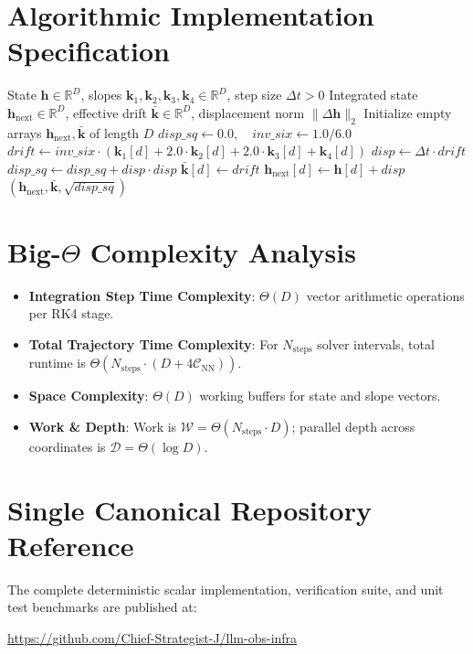 \documentclass[11pt,a4paper]{article}
\theoremstyle{definition}
\begin{document}
\section{Algorithmic Implementation Specification}

\begin{algorithm}[H]
\caption{Fourth-Order Runge-Kutta (RK4) Discrete ODE Integration Step}
\begin{algorithmic}[1]
\Require State $\mathbf{h} \in \mathbb{R}^D$, slopes $\mathbf{k}_1, \mathbf{k}_2, \mathbf{k}_3, \mathbf{k}_4 \in \mathbb{R}^D$, step size $\Delta t > 0$
\Ensure Integrated state $\mathbf{h}_{\text{next}} \in \mathbb{R}^D$, effective drift $\bar{\mathbf{k}} \in \mathbb{R}^D$, displacement norm $\|\Delta \mathbf{h}\|_2$
\State Initialize empty arrays $\mathbf{h}_{\text{next}}, \bar{\mathbf{k}}$ of length $D$
\State $disp\_sq \gets 0.0, \quad inv\_six \gets 1.0 / 6.0$
    \State $drift \gets inv\_six \cdot (\mathbf{k}_1[d] + 2.0 \cdot \mathbf{k}_2[d] + 2.0 \cdot \mathbf{k}_3[d] + \mathbf{k}_4[d])$
    \State $disp \gets \Delta t \cdot drift$
    \State $disp\_sq \gets disp\_sq + disp \cdot disp$
    \State $\bar{\mathbf{k}}[d] \gets drift$
    \State $\mathbf{h}_{\text{next}}[d] \gets \mathbf{h}[d] + disp$
\EndFor
\State \Return $(\mathbf{h}_{\text{next}}, \bar{\mathbf{k}}, \sqrt{disp\_sq})$
\end{algorithmic}
\end{algorithm}

\section{Big-$\Theta$ Complexity Analysis}

\begin{itemize}
    \item \textbf{Integration Step Time Complexity}: $\Theta(D)$ vector arithmetic operations per RK4 stage.
    \item \textbf{Total Trajectory Time Complexity}: For $N_{\text{steps}}$ solver intervals, total runtime is $\Theta(N_{\text{steps}} \cdot (D + 4 \mathcal{C}_{\text{NN}}))$.
    \item \textbf{Space Complexity}: $\Theta(D)$ working buffers for state and slope vectors.
    \item \textbf{Work \& Depth}: Work is $\mathcal{W} = \Theta(N_{\text{steps}} \cdot D)$; parallel depth across coordinates is $\mathcal{D} = \Theta(\log D)$.
\end{itemize}

\section{Single Canonical Repository Reference}

The complete deterministic scalar implementation, verification suite, and unit test benchmarks are published at:
\begin{center}
\url{https://github.com/Chief-Strategist-J/llm-obs-infra}
\end{center}
\end{document}
